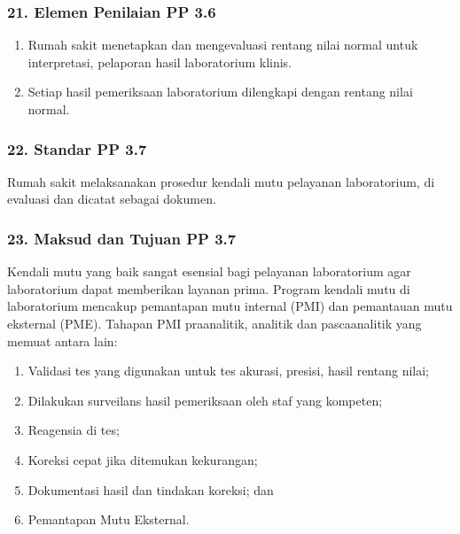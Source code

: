 \documentclass[
]{book}
\providecommand{\tightlist}{%
  \setlength{\itemsep}{0pt}\setlength{\parskip}{0pt}}
\begin{document}
\hypertarget{elemen-penilaian-pp-3.6}{%
\subsubsection*{21. Elemen Penilaian PP 3.6}\label{elemen-penilaian-pp-3.6}}

\begin{enumerate}
\def\labelenumi{\alph{enumi}.}
\tightlist
\item
  Rumah sakit menetapkan dan mengevaluasi rentang nilai normal untuk interpretasi, pelaporan hasil laboratorium klinis.
\item
  Setiap hasil pemeriksaan laboratorium dilengkapi dengan rentang nilai normal.
\end{enumerate}

\hypertarget{standar-pp-3.7}{%
\subsubsection*{22. Standar PP 3.7}\label{standar-pp-3.7}}

Rumah sakit melaksanakan prosedur kendali mutu pelayanan laboratorium, di evaluasi dan dicatat sebagai dokumen.

\hypertarget{maksud-dan-tujuan-pp-3.7}{%
\subsubsection*{23. Maksud dan Tujuan PP 3.7}\label{maksud-dan-tujuan-pp-3.7}}

Kendali mutu yang baik sangat esensial bagi pelayanan laboratorium agar laboratorium dapat memberikan layanan prima. Program kendali mutu di laboratorium mencakup pemantapan mutu internal (PMI) dan pemantauan mutu eksternal (PME). Tahapan PMI praanalitik, analitik dan pascaanalitik yang memuat antara lain:

\begin{enumerate}
\def\labelenumi{\alph{enumi}.}
\tightlist
\item
  Validasi tes yang digunakan untuk tes akurasi, presisi, hasil rentang nilai;
\item
  Dilakukan surveilans hasil pemeriksaan oleh staf yang kompeten;
\item
  Reagensia di tes;
\item
  Koreksi cepat jika ditemukan kekurangan;
\item
  Dokumentasi hasil dan tindakan koreksi; dan
\item
  Pemantapan Mutu Eksternal.
\end{enumerate}
\end{document}

